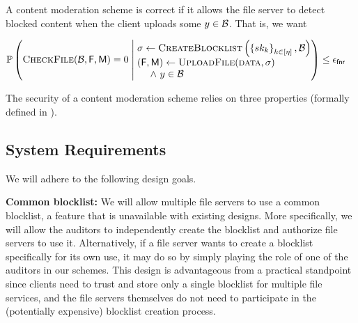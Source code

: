 %
A content moderation scheme is correct if it allows the file server to detect blocked 
content when the client uploads some $\genericCInputElmt \in \blocklist$. That is, we want 

\begin{footnotesize}
	\begin{align*}
	& \cprob{\bigg}{\begin{array}{@{}r@{}}
		\checkContent(\blocklist, \cOutputFile, \cOutputMeta) = 0 
		\end{array}}{\begin{array}[m]{@{}l@{}}
		\genericSig \assign \createBlocklist\left(\setOfAuditorPrivkeys, \blocklist\right) \\
		(\cOutputFile, \cOutputMeta) \assign \uploadFile(\clientData, \genericSig) 
		\\ ~\quad \land ~\genericCInputElmt \in \blocklist
	\end{array}} \le \fnr
\end{align*}
\end{footnotesize}

% 
The security of a content moderation scheme relies on three properties (formally defined in ).
\fi 







\iffalse
\subsection{System Requirements}
%
We will adhere to the following design goals.

\itemListStart
	
	\item \textbf{Common blocklist:} We will allow multiple file servers to use a common blocklist, 
	a feature that is unavailable with existing designs. More specifically, we will allow 
	the auditors to independently create the blocklist and authorize file servers to use it. 
	Alternatively, if a file server wants to create a 	blocklist specifically for its own use, it may do 
	so by simply playing the role of one of the auditors in our schemes. This design is 
	advantageous from a practical standpoint since clients need to trust and store only a single 
	blocklist for multiple file services, and the file servers themselves do not need to participate 
	in the (potentially expensive) blocklist creation process. 
	
